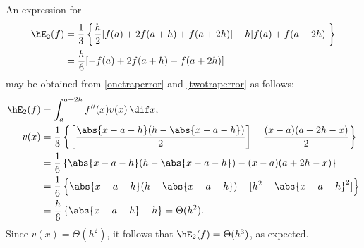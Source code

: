 \documentclass[]{elsarticle}
\theoremstyle{definition}
\theoremstyle{remark}
\begin{document}
An expression for 
\begin{align*}
\hE_2(f) &= \frac{1}{3} \left\{ \frac{h}2[f(a)+2f(a+h)+f(a+2h)] - h[f(a)+f(a+2h)]  \right\} \\
& = \frac{h}{6} [-f(a)+2f(a+h)-f(a+2h)]
\end{align*}
may be obtained from \eqref{onetraperror} and \eqref{twotraperror} as follows:
\begin{align*}
\hE_2(f) &= \int_a^{a+2h} f''(x) v(x) \, \dif x, \\
v(x) &= \frac{1}{3} \left\{ \left[\frac{\abs{x-a-h}(h-\abs{x-a-h})}{2}\right]- \frac{(x-a)(a+2h-x)}{2} \right\} \\
& = \frac{1}{6} \left\{ \abs{x-a-h}(h-\abs{x-a-h}) - (x-a)(a+2h-x) \right\}\\
& = \frac{1}{6} \left\{ \abs{x-a-h}(h-\abs{x-a-h}) - [h^2- \abs{x-a-h}^2] \right\}\\
& = \frac{h}{6} \left\{ \abs{x-a-h} - h \right\}= \Theta(h^2).
\end{align*}
Since $v(x) = \Theta(h^2)$, it follows that $\hE_2(f)=\Theta(h^3)$, as expected.
\end{document}
